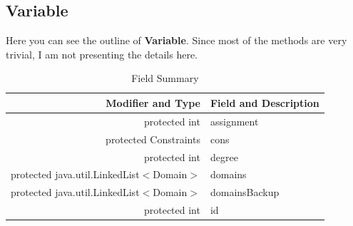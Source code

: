 \documentclass{article}
\begin{document}
\subsection{Variable}

Here you can see the outline of \textbf{Variable}. Since most of the methods are very trivial, I am not presenting the details here.



\begin{table}[h]
\begin{center}
  \begin{tabular}{ |r | l | }
    \hline
    Modifier and Type & Field and Description \\ \hline
    protected int &	assignment                          \\ \hline
protected Constraints &	cons                            \\ \hline
protected int &	degree                                  \\ \hline
protected java.util.LinkedList$<$Domain$>$ &	domains       \\ \hline
protected java.util.LinkedList$<$Domain$>$ &	domainsBackup \\ \hline
protected int &	id \\ \hline

  \end{tabular}
\caption{Field Summary}
\end{center}
\end{table}
\end{document}
